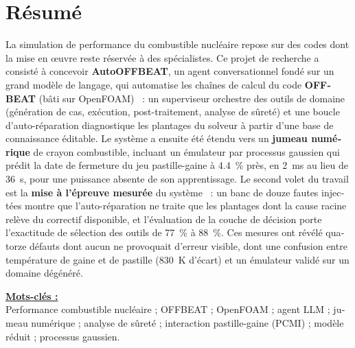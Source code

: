 \section*{Résumé}
\begin{otherlanguage}{french}

\noindent
La simulation de performance du combustible nucléaire repose sur des codes dont
la mise en \oe uvre reste réservée à des spécialistes. Ce projet de recherche a
consisté à concevoir \textbf{AutoOFFBEAT}, un agent conversationnel fondé sur un
grand modèle de langage, qui automatise les chaînes de calcul du code
\textbf{OFFBEAT} (bâti sur OpenFOAM)~ : un superviseur orchestre des outils de
domaine (génération de cas, exécution, post-traitement, analyse de sûreté) et
une boucle d'auto-réparation diagnostique les plantages du solveur à partir
d'une base de connaissance éditable. Le système a ensuite été étendu vers un
\textbf{jumeau numérique} de crayon combustible, incluant un émulateur par
processus gaussien qui prédit la date de fermeture du jeu pastille-gaine à
\SI{4.4}{\percent} près, en \SI{2}{\milli\second} au lieu de \SI{36}{\second},
pour une puissance absente de son apprentissage. Le second volet du travail est
la \textbf{mise à l'épreuve mesurée} du système~ : un banc de douze fautes
injectées montre que l'auto-réparation ne traite que les plantages dont la cause
racine relève du correctif disponible, et l'évaluation de la couche de décision
porte l'exactitude de sélection des outils de \SI{77}{\percent} à
\SI{88}{\percent}. Ces mesures ont révélé quatorze défauts dont aucun ne
provoquait d'erreur visible, dont une confusion entre température de gaine et
de pastille (\SI{830}{\kelvin} d'écart) et un émulateur validé sur un domaine
dégénéré.

\vspace{0.35cm}
\noindent\textbf{\underline{Mots-clés :}}\\[2pt]
Performance combustible nucléaire ; OFFBEAT ; OpenFOAM ; agent LLM ;
jumeau numérique ; analyse de sûreté ; interaction pastille-gaine (PCMI) ;
modèle réduit ; processus gaussien.

\end{otherlanguage}

\clearpage

\renewcommand{\contentsname}{Contents}
\setcounter{tocdepth}{1}
\tableofcontents
\clearpage

